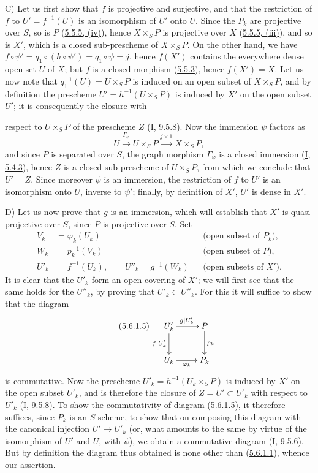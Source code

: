 C) Let us first show that $f$ is projective and surjective, and that the
restriction of $f$ to $U'=f^{-1}(U)$ is an isomorphism of $U'$ onto $U$.
Since the $P_k$ are projective over $S$, so is $P$
(\hyperref[II.5.5.5]{5.5.5, (iv)}), hence $X\times_SP$ is projective over
$X$ (\hyperref[II.5.5.5]{5.5.5, (iii)}), and so is $X'$, which is a
closed sub-prescheme of $X\times_SP$. On the other hand, we have
$f\circ\psi'=q_1\circ(h\circ\psi')=q_1\circ\psi=j$, hence $f(X')$ contains
the everywhere dense open set $U$ of $X$; but $f$ is a closed morphism
(\hyperref[II.5.5.3]{5.5.3}), hence $f(X')=X$. Let us now note that
$q_1^{-1}(U)=U\times_SP$ is induced on an open subset of $X\times_SP$, and
by definition the prescheme $U'=h^{-1}(U\times_SP)$ is induced by $X'$ on
the open subset $U'$; it is consequently the closure with


respect to $U\times_SP$ of the prescheme $Z$
(\hyperref[I.9.5.8]{I, 9.5.8}). Now the immersion $\psi$ factors as
\[
U\xrightarrow{\Gamma_\varphi}U\times_SP\xrightarrow{j\times1}X\times_SP,
\]
and since $P$ is separated over $S$, the graph morphism $\Gamma_\varphi$ is
a closed immersion (\hyperref[I.5.4.3]{I, 5.4.3}), hence $Z$ is a
closed sub-prescheme of $U\times_SP$, from which we conclude that $U'=Z$.
Since moreover $\psi$ is an immersion, the restriction of $f$ to $U'$ is an
isomorphism onto $U$, inverse to $\psi'$; finally, by definition of $X'$,
$U'$ is dense in $X'$.

D) Let us now prove that $g$ is an immersion, which will establish that $X'$
is quasi-projective over $S$, since $P$ is projective over $S$. Set
\begin{align*}
V_k&=\varphi_k(U_k) &&\text{(open subset of $P_k$)},\\
W_k&=p_k^{-1}(V_k) &&\text{(open subset of $P$)},\\
U'_k&=f^{-1}(U_k),\qquad U''_k=g^{-1}(W_k)
&&\text{(open subsets of $X'$)}.
\end{align*}
It is clear that the $U'_k$ form an open covering of $X'$; we will first see
that the same holds for the $U''_k$, by proving that
$U'_k\subset U''_k$. For this it will suffice to show that the diagram
\[
\tag{5.6.1.5}
\label{II.5.6.1.5}
\xymatrix{
U'_k\ar[r]^{g|U'_k}\ar[d]_{f|U'_k} & P\ar[d]^{p_k}\\
U_k\ar[r]_{\varphi_k} & P_k
}
\]
is commutative. Now the prescheme $U'_k=h^{-1}(U_k\times_SP)$ is induced by
$X'$ on the open subset $U'_k$, and is therefore the closure of
$Z=U'\subset U'_k$ with respect to $U'_k$ (\hyperref[I.9.5.8]{I, 9.5.8}).
To show the commutativity of diagram (\hyperref[II.5.6.1.5]{5.6.1.5}), it
therefore suffices, since $P_k$ is an $S$-scheme, to show that on composing
this diagram with the canonical injection $U'\to U'_k$ (or, what amounts to
the same by virtue of the isomorphism of $U'$ and $U$, with $\psi$), we
obtain a commutative diagram (\hyperref[I.9.5.6]{I, 9.5.6}). But by
definition the diagram thus obtained is none other than
(\hyperref[II.5.6.1.1]{5.6.1.1}), whence our assertion.

